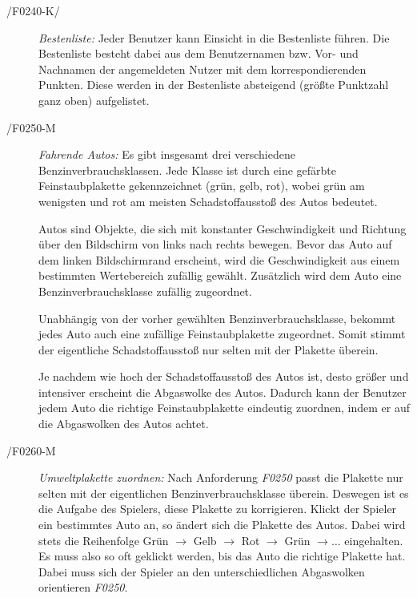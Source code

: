 \begin{loesung}
\begin{enumerate}[(a)]
\begin{description}
                        \item[/F0240-K/] \textit{Bestenliste:} 
                        Jeder Benutzer kann Einsicht in die Bestenliste führen. Die Bestenliste besteht dabei aus dem Benutzernamen bzw. Vor- und Nachnamen der angemeldeten Nutzer mit dem korrespondierenden Punkten. Diese werden in der Bestenliste absteigend (größte Punktzahl ganz oben) aufgelistet.
                        
                        \item[/F0250-M] \textit{Fahrende Autos:} 
                        Es gibt insgesamt drei verschiedene Benzinverbrauchsklassen. Jede Klasse ist durch eine gefärbte Feinstaubplakette gekennzeichnet (grün, gelb, rot), wobei grün am wenigsten und rot am meisten Schadstoffausstoß des Autos bedeutet.
                        
                        Autos sind Objekte, die sich mit konstanter Geschwindigkeit und Richtung über den Bildschirm von links nach rechts bewegen. Bevor das Auto auf dem linken Bildschirmrand erscheint, wird die Geschwindigkeit aus einem bestimmten Wertebereich zufällig gewählt. Zusätzlich wird dem Auto eine Benzinverbrauchsklasse zufällig zugeordnet.
                        
                        Unabhängig von der vorher gewählten Benzinverbrauchsklasse, bekommt jedes Auto auch eine zufällige Feinstaubplakette zugeordnet. Somit stimmt der eigentliche Schadstoffausstoß nur selten mit der Plakette überein.
                        
                        Je nachdem wie hoch der Schadstoffausstoß des Autos ist, desto größer und intensiver erscheint die Abgaswolke des Autos. Dadurch kann der Benutzer jedem Auto die richtige Feinstaubplakette eindeutig zuordnen, indem er auf die Abgaswolken des Autos achtet.   
                        
                        \item[/F0260-M] \textit{Umweltplakette zuordnen:} 
                        Nach Anforderung \textit{F0250} passt die Plakette nur selten mit der eigentlichen Benzinverbrauchsklasse überein. Deswegen ist es die Aufgabe des Spielers, diese Plakette zu korrigieren. Klickt der Spieler ein bestimmtes Auto an, so ändert sich die Plakette des Autos. Dabei wird stets die Reihenfolge Grün $\rightarrow$ Gelb $\rightarrow$ Rot $\rightarrow$ Grün $\rightarrow \dots$ eingehalten. Es muss also so oft geklickt werden, bis das Auto die richtige Plakette hat. Dabei muss sich der Spieler an den unterschiedlichen Abgaswolken orientieren \textit{F0250}.
                        

\end{description}
\end{enumerate}
\end{loesung}
